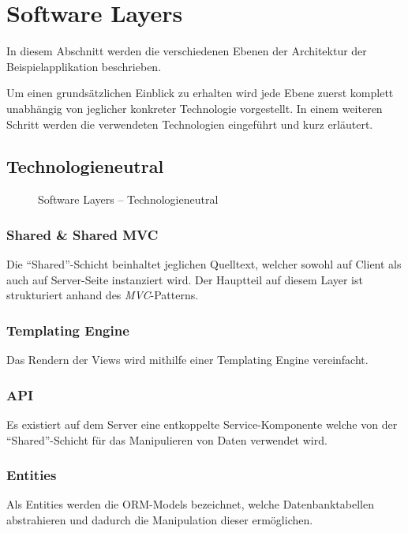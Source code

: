 \section{Software Layers}
\label{sec:sad-layers}

In diesem Abschnitt werden die verschiedenen Ebenen der Architektur der Beispielapplikation beschrieben.

Um einen grundsätzlichen Einblick zu erhalten wird jede Ebene zuerst komplett unabhängig von jeglicher konkreter Technologie vorgestellt. In einem weiteren Schritt werden die verwendeten Technologien eingeführt und kurz erläutert.


\subsection*{Technologieneutral}

\begin{figure}[H]
	\centering{
		
	}

	\caption{Software Layers -- Technologieneutral}
\end{figure}

\subsubsection*{Shared \& Shared MVC}
Die ``Shared''-Schicht beinhaltet jeglichen Quelltext, welcher sowohl auf Client als auch auf Server-Seite instanziert wird. Der Hauptteil auf diesem Layer ist strukturiert anhand des \emph{MVC}-Patterns.

\subsubsection*{Templating Engine}
Das Rendern der Views wird mithilfe einer Templating Engine vereinfacht.

\subsubsection*{API}
Es existiert auf dem Server eine entkoppelte Service-Komponente welche von der ``Shared''-Schicht für das Manipulieren von Daten verwendet wird.

\subsubsection*{Entities}
Als Entities werden die \gls{ORM}-Models bezeichnet, welche Datenbanktabellen abstrahieren und dadurch die Manipulation dieser ermöglichen.

